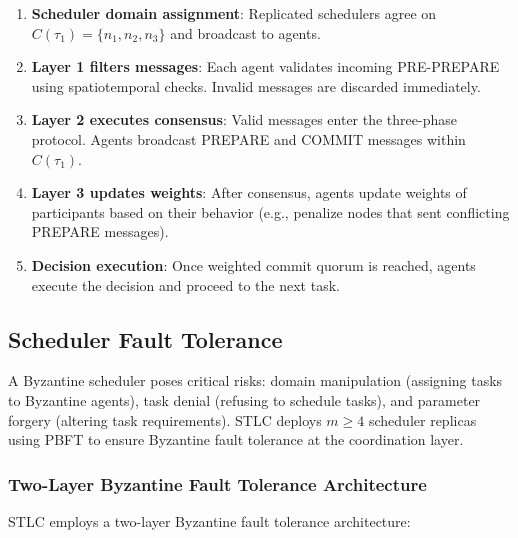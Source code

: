 \documentclass[lettersize,journal]{IEEEtran}
\begin{document}
\begin{enumerate}
\item \textbf{Scheduler domain assignment}: Replicated schedulers
agree on $C(\tau_1) = \{n_1, n_2, n_3\}$
and broadcast to agents.

\item \textbf{Layer 1 filters messages}: Each agent validates incoming 
      PRE-PREPARE using spatiotemporal checks. Invalid messages are 
      discarded immediately.

\item \textbf{Layer 2 executes consensus}: Valid messages enter the 
      three-phase protocol. Agents broadcast PREPARE and COMMIT 
      messages within $C(\tau_1)$.

\item \textbf{Layer 3 updates weights}: After consensus, agents update 
      weights of participants based on their behavior (e.g., penalize 
      nodes that sent conflicting PREPARE messages).

\item \textbf{Decision execution}: Once weighted commit quorum is 
      reached, agents execute the decision and proceed to the next task.

\end{enumerate}

\subsection{Scheduler Fault Tolerance}
\label{sec:scheduler_ft}

A Byzantine scheduler poses critical risks: domain manipulation (assigning
tasks to Byzantine agents), task denial (refusing to schedule tasks), and
parameter forgery (altering task requirements). STLC deploys $m \geq 4$
scheduler replicas using PBFT to ensure Byzantine fault tolerance at the
coordination layer.

\subsubsection{Two-Layer Byzantine Fault Tolerance Architecture}
\label{sec:two_layer_bft}

STLC employs a two-layer Byzantine fault tolerance architecture:
\end{document}

